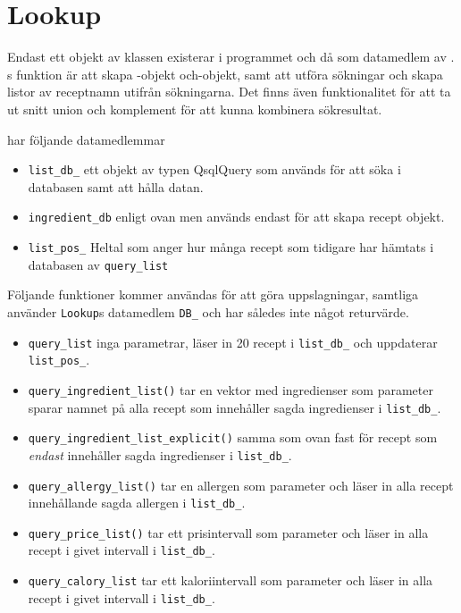 
\section{Lookup}
Endast ett objekt av klassen \Lookup{} existerar i programmet och då som datamedlem av \Shell. \Lookup{}s funktion är att skapa \Recipe-objekt och\InfoIngredient-objekt, samt att utföra sökningar och skapa listor av receptnamn utifrån sökningarna. Det finns även funktionalitet för att ta ut snitt union och komplement för att kunna kombinera sökresultat.

\Lookup har följande datamedlemmar
  \begin{itemize}
    \item   \verb+list_db_+ ett objekt av typen QsqlQuery som används för att söka i databasen samt att hålla datan.
    \item   \verb+ingredient_db+ enligt ovan men används endast för att skapa recept objekt.
    \item   \verb+list_pos_+ Heltal som anger hur många recept som tidigare har hämtats i databasen av \verb+query_list+
  \end{itemize}

Följande funktioner kommer användas för att göra uppslagningar,
samtliga använder \verb+Lookup+s datamedlem \verb+DB_+ och har således 
inte något returvärde. 

  \begin{itemize}
    \item   \verb+query_list+ inga parametrar, läser in 20 recept i \verb+list_db_+ och uppdaterar \verb+list_pos_+.
    \item   \verb+query_ingredient_list()+ tar en vektor med ingredienser som parameter sparar namnet på alla recept som innehåller sagda ingredienser i \verb+list_db_+.
    \item   \verb+query_ingredient_list_explicit()+ samma som ovan fast för recept som \emph{endast} innehåller sagda ingredienser i \verb+list_db_+.
    \item   \verb+query_allergy_list()+ tar en allergen som parameter och läser in alla recept innehållande sagda allergen i \verb+list_db_+.
    \item   \verb+query_price_list()+ tar ett prisintervall som parameter och läser in alla recept i givet intervall i \verb+list_db_+.
    \item   \verb+query_calory_list+ tar ett kaloriintervall som parameter och läser in alla recept i givet intervall i \verb+list_db_+.
  \end{itemize}
 

